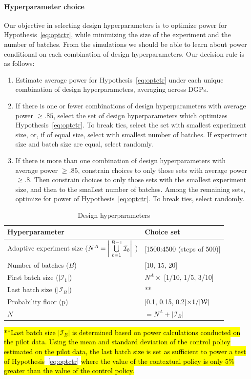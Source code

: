 \documentclass[letterpaper, 12pt, parskip=full,]{scrartcl}
\begin{document}
\paragraph{Hyperparameter choice}
Our objective in selecting design hyperparameters is to optimize power for Hypothesis~\ref{eq:optctr}, while minimizing the size of the experiment and the number of batches. From the simulations we should be able to learn about power conditional on each combination of design hyperparameters. Our decision rule is as follows:
\begin{enumerate}
\item Estimate average power for Hypothesis~\ref{eq:optctr} under each unique combination of design hyperparameters, averaging across DGPs. 
\item If there is one or fewer combinations of design hyperparameters with average power $\ge.85$, select the set of design hyperparameters which optimizes Hypothesis~\ref{eq:optctr}. To break ties, select the set with smallest experiment size, or, if of equal size, select with smallest number of batches. If experiment size and batch size are equal, select randomly. 
\item If there is more than one combination of design hyperparameters with average power $\ge.85$, constrain choices to only those sets with average power $\ge.8$. Then constrain choices to only those sets with the smallest experiment size, and then to the smallest number of batches. Among the remaining sets, optimize for power of Hypothesis~\ref{eq:optctr}. To break ties, select randomly. 
\end{enumerate}

\begin{table}[H]
\centering
\caption{Design hyperparameters} 
\label{tab:design}
\begin{tabular}{l | l}
\textbf{Hyperparameter} & \textbf{Choice set} \\ \hline
Adaptive experiment size ($N^A = \bigg{\lvert} \bigcup\limits_{b=1}^{B-1} \mathcal{I}_{b} \bigg{\rvert}$ )& [1500:4500 (steps of 500)] \\
Number of batches ($B$)& [10, 15, 20] \\
First batch size ($|\mathcal{I}_1|$) & $N^A \times$ [1/10, 1/5, 3/10] \\
Last batch size ($|\mathcal{I}_B|$) & **  \\
Probability floor (p)& [0.1, 0.15, 0.2]$\times 1/ |{\EuScript W}|$ \\
$N$ & $=N^A + |\mathcal{I}_B| $\\
\hline
\end{tabular}
\end{table}
\hl{**Last batch size $|\mathcal{I}_B|$ is determined based on power calculations conducted on the pilot data. Using the mean and standard deviation of the control policy estimated on the pilot data, the last batch size is set as sufficient to power a test of Hypothesis}~\ref{eq:optctr}\hl{ where the value of the contextual policy is only 5\% greater than the value of the control policy.}
\end{document}
